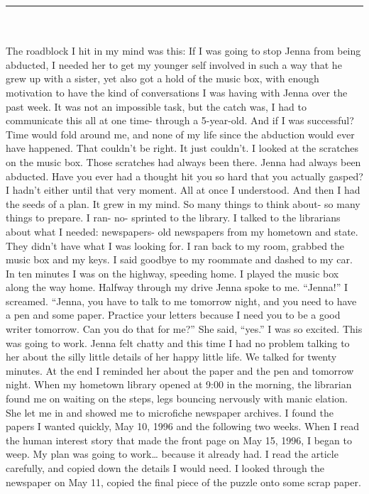 \documentclass[a4paper]{article}
\begin{document}
\hrule ~ \\ \\

The roadblock I hit in my mind was this: If I was going to stop Jenna from being abducted, I needed her to get my younger self involved in such a way that he grew up with a sister, yet also got a hold of the music box, with enough motivation to have the kind of conversations I was having with Jenna over the past week.
It was not an impossible task, but the catch was, I had to communicate this all at one time- through a 5-year-old. And if I was successful? Time would fold around me, and none of my life since the abduction would ever have happened.
That couldn’t be right. It just couldn’t. I looked at the scratches on the music box. Those scratches had always been there. Jenna had always been abducted.
Have you ever had a thought hit you so hard that you actually gasped? I hadn’t either until that very moment.
All at once I understood. And then I had the seeds of a plan. It grew in my mind. So many things to think about- so many things to prepare.
I ran- no- sprinted to the library. I talked to the librarians about what I needed: newspapers- old newspapers from my hometown and state. They didn’t have what I was looking for.
I ran back to my room, grabbed the music box and my keys. I said goodbye to my roommate and dashed to my car. In ten minutes I was on the highway, speeding home.
I played the music box along the way home. Halfway through my drive Jenna spoke to me.
“Jenna!” I screamed. “Jenna, you have to talk to me tomorrow night, and you need to have a pen and some paper. Practice your letters because I need you to be a good writer tomorrow. Can you do that for me?”
She said, “yes.” I was so excited. This was going to work.
Jenna felt chatty and this time I had no problem talking to her about the silly little details of her happy little life. We talked for twenty minutes. At the end I reminded her about the paper and the pen and tomorrow night.
When my hometown library opened at 9:00 in the morning, the librarian found me on waiting on the steps, legs bouncing nervously with manic elation. She let me in and showed me to microfiche newspaper archives.
I found the papers I wanted quickly, May 10, 1996 and the following two weeks. When I read the human interest story that made the front page on May 15, 1996, I began to weep. My plan was going to work… because it already had.
I read the article carefully, and copied down the details I would need. I looked through the newspaper on May 11, copied the final piece of the puzzle onto some scrap paper.
\end{document}
